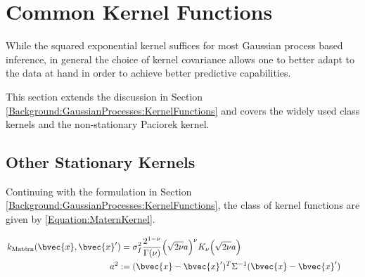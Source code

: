 \chapter{Common Kernel Functions}
\label{Appendix:CommonKernelFunctions}

	While the squared exponential kernel suffices for most Gaussian process based inference, in general the choice of kernel covariance allows one to better adapt to the data at hand in order to achieve better predictive capabilities.
	
	This section extends the discussion in Section \ref{Background:GaussianProcesses:KernelFunctions} and covers the widely used \matern class kernels and the non-stationary Paciorek kernel.
	
	\section{Other Stationary Kernels}
	
				Continuing with the formulation in Section \ref{Background:GaussianProcesses:KernelFunctions}, the \matern class of kernel functions are given by \eqref{Equation:MaternKernel}.
				
				\begin{equation}
					\left.
						\begin{aligned}
							k_{\mathrm{\maternmath}}(\bvec{x}, \bvec{x}') =& \; \sigma_{f}^{2} \frac{2^{1 - \nu}}{\Gamma(\nu)} \Big( \sqrt{2 \nu} a \Big)^{\nu} K_{\nu}\Big( \sqrt{2 \nu} a \Big) \\
							a^{2} :=& \; (\bvec{x} - \bvec{x}')^{T} \Sigma^{-1} (\bvec{x} - \bvec{x}')
						\end{aligned}
					\qquad \right.
				\label{Equation:MaternKernel}
				\end{equation}
							
